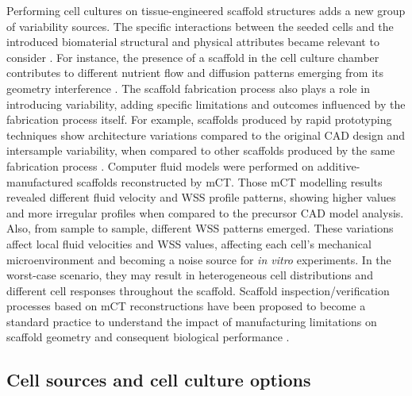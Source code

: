 Performing cell cultures on tissue-engineered scaffold structures adds a new group of variability sources. The specific interactions between the seeded cells and the introduced biomaterial structural and physical attributes became relevant to consider \cite{Zaeri2022-wk}. For instance, the presence of a scaffold in the cell culture chamber contributes to different nutrient flow and diffusion patterns emerging from its geometry interference \cite{Woo_Jung2013-yq}. The scaffold fabrication process also plays a role in introducing variability, adding specific limitations and outcomes influenced by the fabrication process itself. For example, scaffolds produced by rapid prototyping techniques show architecture variations compared to the original \ac{CAD} design and intersample variability, when compared to other scaffolds produced by the same fabrication process \cite{Campos_Marin2015-qc}. Computer fluid models were performed on additive-manufactured scaffolds reconstructed by \ac{mCT}. Those \ac{mCT} modelling results revealed different fluid velocity and \ac{WSS} profile patterns, showing higher values and more irregular profiles when compared to the precursor \ac{CAD} model analysis. Also, from sample to sample, different \ac{WSS} patterns emerged. These variations affect local fluid velocities and \ac{WSS} values, affecting each cell's mechanical microenvironment and becoming a noise source for \textit{in vitro} experiments. In the worst-case scenario, they may result in heterogeneous cell distributions and different cell responses throughout the scaffold. Scaffold inspection/verification processes based on \ac{mCT} reconstructions have been proposed to become a standard practice to understand the impact of manufacturing limitations on scaffold geometry and consequent biological performance \cite{Podshivalov2013-sy}. 

\subsection{Cell sources and cell culture options}

